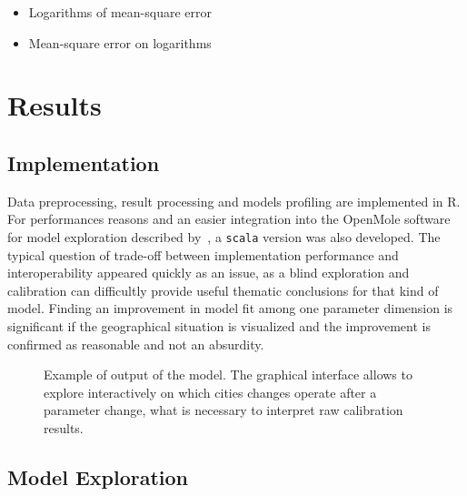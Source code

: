 \documentclass[Royal,sageh,times]{sagej}
\begin{document}
\begin{itemize}
\item Logarithms of mean-square error
\item Mean-square error on logarithms
\end{itemize}







\section{Results}



\subsection{Implementation}

Data preprocessing, result processing and models profiling are implemented in R. For performances reasons and an easier integration into the OpenMole software for model exploration described by~\cite{reuillon2013openmole}, a \texttt{scala} version was also developed. The typical question of trade-off between implementation performance and interoperability appeared quickly as an issue, as a blind exploration and calibration can difficultly provide useful thematic conclusions for that kind of model. Finding an improvement in model fit among one parameter dimension is significant if the geographical situation is visualized and the improvement is confirmed as reasonable and not an absurdity.


\begin{figure}
\centering
\caption{Example of output of the model. The graphical interface allows to explore interactively on which cities changes operate after a parameter change, what is necessary to interpret raw calibration results.}
\end{figure}




\subsection{Model Exploration}

\end{document}

